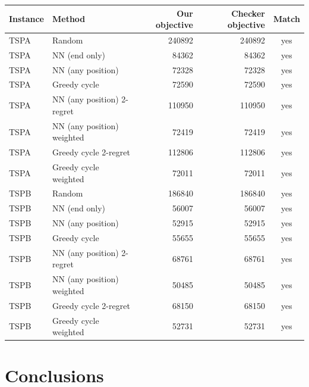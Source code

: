 \documentclass[11pt,a4paper]{article}
\begin{document}
\begin{table}[H]
\centering
\begin{tabular}{llrrc}
\toprule
Instance & Method & Our objective & Checker objective & Match \\
\midrule
TSPA & Random & 240892 & 240892 & yes \\
TSPA & NN (end only) & 84362 & 84362 & yes \\
TSPA & NN (any position) & 72328 & 72328 & yes \\
TSPA & Greedy cycle & 72590 & 72590 & yes \\
TSPA & NN (any position) 2-regret & 110950 & 110950 & yes \\
TSPA & NN (any position) weighted & 72419 & 72419 & yes \\
TSPA & Greedy cycle 2-regret & 112806 & 112806 & yes \\
TSPA & Greedy cycle weighted & 72011 & 72011 & yes \\
\midrule
TSPB & Random & 186840 & 186840 & yes \\
TSPB & NN (end only) & 56007 & 56007 & yes \\
TSPB & NN (any position) & 52915 & 52915 & yes \\
TSPB & Greedy cycle & 55655 & 55655 & yes \\
TSPB & NN (any position) 2-regret & 68761 & 68761 & yes \\
TSPB & NN (any position) weighted & 50485 & 50485 & yes \\
TSPB & Greedy cycle 2-regret & 68150 & 68150 & yes \\
TSPB & Greedy cycle weighted & 52731 & 52731 & yes \\
\bottomrule
\end{tabular}
\end{table}

\section{Conclusions}
\end{document}
